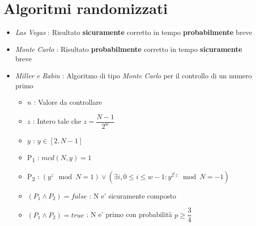 \section{Algoritmi randomizzati}

\begin{itemize}
    \item \textit{Las Vegas} : Risultato \textbf{sicuramente} corretto in tempo \textbf{probabilmente} breve
    \item \textit{Monte Carlo} : Risultato \textbf{probabilmente} corretto in tempo \textbf{sicuramente} breve
    \item \textit{Miller e Rabin} : Algoritmo di tipo \textit{Monte Carlo} per il controllo di un numero primo
    \begin{itemize}
        \item $n$ : Valore da controllare
        \item $z$ : Intero tale che $z = \dfrac{N - 1}{2^w}$
        \item $y$ : $y \in [2, N-1]$ 
        \item P\textsubscript{1} : $mcd(N, y) = 1$
        \item P\textsubscript{2} : $(y^z \mod{N} = 1) \vee (\exists{i}, 0 \leq i \leq w-1 : y^{2^iz} \mod{N} = -1)$
        \item $(P_1 \wedge P_2) = false$ : N e' sicuramente composto
        \item $(P_1 \wedge P_2) = true$ : N e' primo con probabilità $p \geq \dfrac{3}{4}$
    \end{itemize}
\end{itemize}